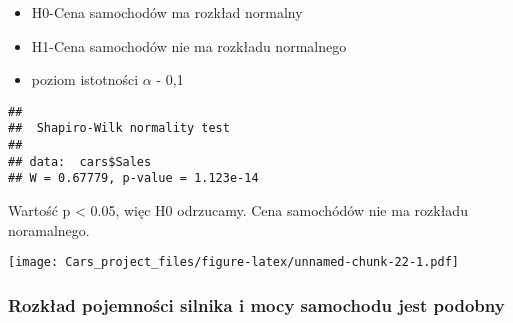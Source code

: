 \documentclass[
]{article}
\newenvironment{Shaded}{\begin{snugshade}}{\end{snugshade}}
\newcommand{\AttributeTok}[1]{\textcolor[rgb]{0.77,0.63,0.00}{#1}}
\newcommand{\FunctionTok}[1]{\textcolor[rgb]{0.00,0.00,0.00}{#1}}
\newcommand{\NormalTok}[1]{#1}
\newcommand{\SpecialCharTok}[1]{\textcolor[rgb]{0.00,0.00,0.00}{#1}}
\newcommand{\StringTok}[1]{\textcolor[rgb]{0.31,0.60,0.02}{#1}}
\providecommand{\tightlist}{%
  \setlength{\itemsep}{0pt}\setlength{\parskip}{0pt}}
\begin{document}
\begin{itemize}
\tightlist
\item
  H0-Cena samochodów ma rozkład normalny
\item
  H1-Cena samochodów nie ma rozkładu normalnego
\item
  poziom istotności \(\alpha\) - 0,1
\end{itemize}

\begin{Shaded}
\end{Shaded}

\begin{verbatim}
## 
##  Shapiro-Wilk normality test
## 
## data:  cars$Sales
## W = 0.67779, p-value = 1.123e-14
\end{verbatim}

Wartość p \textless{} 0.05, więc H0 odrzucamy. Cena samochódów nie ma
rozkładu noramalnego.

\begin{Shaded}
\end{Shaded}

\texttt{[image: Cars\_project\_files/figure-latex/unnamed-chunk-22-1.pdf]}

\hypertarget{rozkux142ad-pojemnoux15bci-silnika-i-mocy-samochodu-jest-podobny}{%
\subsubsection{Rozkład pojemności silnika i mocy samochodu jest
podobny}\label{rozkux142ad-pojemnoux15bci-silnika-i-mocy-samochodu-jest-podobny}}

\begin{Shaded}
\end{Shaded}
\end{document}
